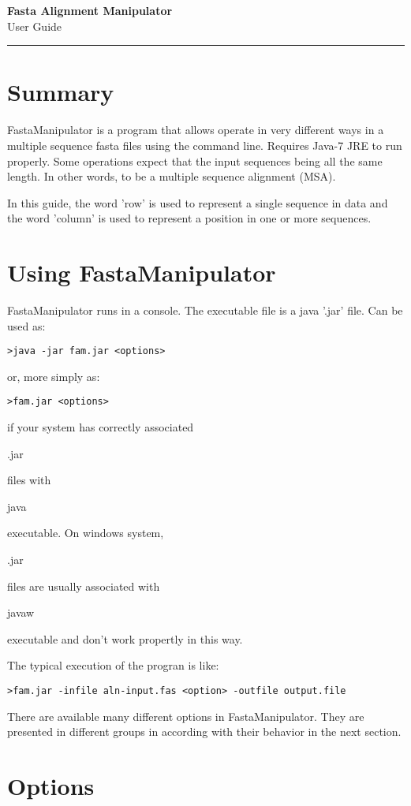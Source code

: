 \documentclass[a4paper, twoside,10pt]{article}
\newcommand{\materiaName}{Fasta Alignment Manipulator}				                            %
\newcommand{\seminarioName}{User Guide}            %
\newcommand{\titulo}{																											%
	\begin{center}																												  %
	\vspace*{-22pt}\large\textbf{\materiaName}\\										        %
	\vspace{2pt}\normalsize{\seminarioName}\\																%
	\vspace{-6pt}\rule{\textwidth}{0.4pt}
	\end{center}	
}
\begin{document}
\titulo

\tableofcontents

\section{Summary}
FastaManipulator is a program that allows operate in very different ways in a
multiple sequence fasta files using the command line. Requires Java-7 JRE to run
properly. Some operations expect that the input sequences being all the same
length. In other words, to be a multiple sequence alignment (MSA).

In this guide, the word 'row' is used to represent a single sequence in data and
the word 'column' is used to represent a position in one or more sequences.

\section{Using FastaManipulator}
FastaManipulator runs in a console. The executable file is a java '.jar' file.
Can be used as:
\begin{verbatim}
>java -jar fam.jar <options>
\end{verbatim} 
or, more simply as: 
\begin{verbatim}
>fam.jar <options>
\end{verbatim} 
if your system has correctly associated \begin{tt}.jar\end{tt} files with 
\begin{tt}java\end{tt} executable. On windows system, \begin{tt}.jar\end{tt}  
files are usually associated with \begin{tt}javaw\end{tt} executable and 
don't work propertly in this way.

The typical execution of the progran is like:

\begin{verbatim}
>fam.jar -infile aln-input.fas <option> -outfile output.file
\end{verbatim}

There are available many different options in FastaManipulator. They are 
presented in different groups in according with their behavior in the next 
section.
\section{Options}
\end{document}
